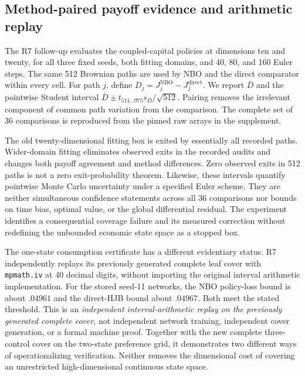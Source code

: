 \subsection{Method-paired payoff evidence and arithmetic replay}\label{sec:r8-coverage}
The R7 follow-up evaluates the coupled-capital policies at dimensions ten and twenty, for all three fixed seeds, both fitting domains, and 40, 80, and 160 Euler steps. The same 512 Brownian paths are used by NBO and the direct comparator within every cell. For path $j$, define $D_j=J_j^{\mathrm{NBO}}-J_j^{\mathrm{direct}}$. We report $\overline D$ and the pointwise Student interval $\overline D\pm t_{511,.975}s_D/\sqrt{512}$. Pairing removes the irrelevant component of common path variation from the comparison. The complete set of 36 comparisons is reproduced from the pinned raw arrays in the supplement.

The old twenty-dimensional fitting box is exited by essentially all recorded paths. Wider-domain fitting eliminates observed exits in the recorded audits and changes both payoff agreement and method differences. Zero observed exits in 512 paths is not a zero exit-probability theorem. Likewise, these intervals quantify pointwise Monte Carlo uncertainty under a specified Euler scheme. They are neither simultaneous confidence statements across all 36 comparisons nor bounds on time bias, optimal value, or the global differential residual. The experiment identifies a consequential coverage failure and its measured correction without redefining the unbounded economic state space as a stopped box.

The one-state consumption certificate has a different evidentiary status. R7 independently replays its previously generated complete leaf cover with \texttt{mpmath.iv} at 40 decimal digits, without importing the original interval arithmetic implementation. For the stored seed-11 networks, the NBO policy-loss bound is about $.04961$ and the direct-HJB bound about $.04967$. Both meet the stated threshold. This is an \emph{independent interval-arithmetic replay on the previously generated complete cover}, not independent network training, independent cover generation, or a formal machine proof. Together with the new complete three-control cover on the two-state preference grid, it demonstrates two different ways of operationalizing verification. Neither removes the dimensional cost of covering an unrestricted high-dimensional continuous state space.
